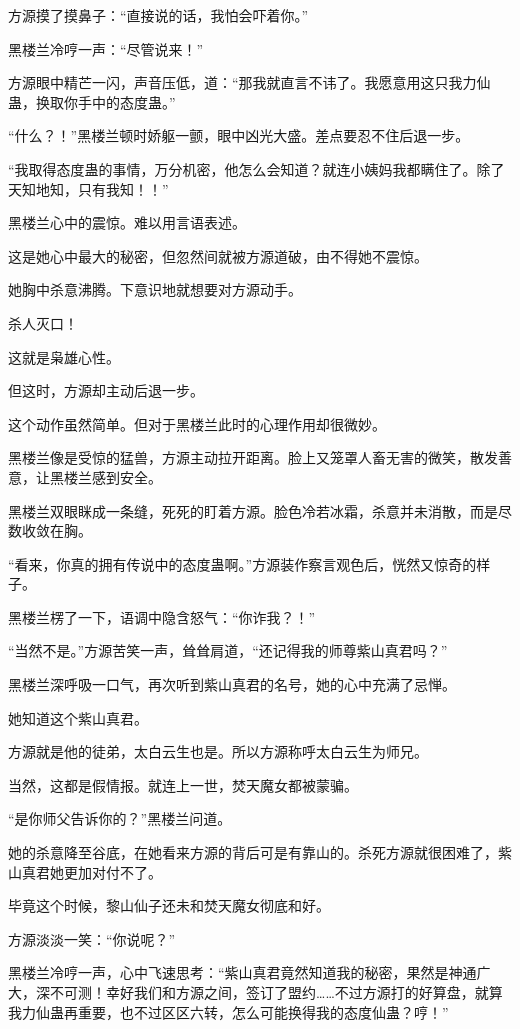 \begin{this_body}
方源摸了摸鼻子：“直接说的话，我怕会吓着你。”

黑楼兰冷哼一声：“尽管说来！”

方源眼中精芒一闪，声音压低，道：“那我就直言不讳了。我愿意用这只我力仙蛊，换取你手中的态度蛊。”

“什么？！”黑楼兰顿时娇躯一颤，眼中凶光大盛。差点要忍不住后退一步。

“我取得态度蛊的事情，万分机密，他怎么会知道？就连小姨妈我都瞒住了。除了天知地知，只有我知！！”

黑楼兰心中的震惊。难以用言语表述。

这是她心中最大的秘密，但忽然间就被方源道破，由不得她不震惊。

她胸中杀意沸腾。下意识地就想要对方源动手。

杀人灭口！

这就是枭雄心性。

但这时，方源却主动后退一步。

这个动作虽然简单。但对于黑楼兰此时的心理作用却很微妙。

黑楼兰像是受惊的猛兽，方源主动拉开距离。脸上又笼罩人畜无害的微笑，散发善意，让黑楼兰感到安全。

黑楼兰双眼眯成一条缝，死死的盯着方源。脸色冷若冰霜，杀意并未消散，而是尽数收敛在胸。

“看来，你真的拥有传说中的态度蛊啊。”方源装作察言观色后，恍然又惊奇的样子。

黑楼兰楞了一下，语调中隐含怒气：“你诈我？！”

“当然不是。”方源苦笑一声，耸耸肩道，“还记得我的师尊紫山真君吗？”

黑楼兰深呼吸一口气，再次听到紫山真君的名号，她的心中充满了忌惮。

她知道这个紫山真君。

方源就是他的徒弟，太白云生也是。所以方源称呼太白云生为师兄。

当然，这都是假情报。就连上一世，焚天魔女都被蒙骗。

“是你师父告诉你的？”黑楼兰问道。

她的杀意降至谷底，在她看来方源的背后可是有靠山的。杀死方源就很困难了，紫山真君她更加对付不了。

毕竟这个时候，黎山仙子还未和焚天魔女彻底和好。

方源淡淡一笑：“你说呢？”

黑楼兰冷哼一声，心中飞速思考：“紫山真君竟然知道我的秘密，果然是神通广大，深不可测！幸好我们和方源之间，签订了盟约……不过方源打的好算盘，就算我力仙蛊再重要，也不过区区六转，怎么可能换得我的态度仙蛊？哼！”


\end{this_body}
